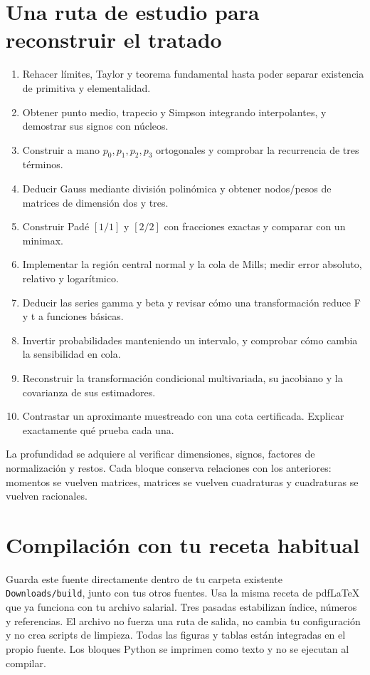 \documentclass[11pt,a4paper]{article}
\theoremstyle{definition}
\begin{document}
\section{Una ruta de estudio para reconstruir el tratado}
\begin{enumerate}
\item Rehacer límites, Taylor y teorema fundamental hasta poder separar existencia de primitiva y elementalidad.
\item Obtener punto medio, trapecio y Simpson integrando interpolantes, y demostrar sus signos con núcleos.
\item Construir a mano $p_0,p_1,p_2,p_3$ ortogonales y comprobar la recurrencia de tres términos.
\item Deducir Gauss mediante división polinómica y obtener nodos/pesos de matrices de dimensión dos y tres.
\item Construir Padé $[1/1]$ y $[2/2]$ con fracciones exactas y comparar con un minimax.
\item Implementar la región central normal y la cola de Mills; medir error absoluto, relativo y logarítmico.
\item Deducir las series gamma y beta y revisar cómo una transformación reduce F y t a funciones básicas.
\item Invertir probabilidades manteniendo un intervalo, y comprobar cómo cambia la sensibilidad en cola.
\item Reconstruir la transformación condicional multivariada, su jacobiano y la covarianza de sus estimadores.
\item Contrastar un aproximante muestreado con una cota certificada. Explicar exactamente qué prueba cada una.
\end{enumerate}
La profundidad se adquiere al verificar dimensiones, signos, factores de normalización y restos. Cada bloque conserva relaciones con los anteriores: momentos se vuelven matrices, matrices se vuelven cuadraturas y cuadraturas se vuelven racionales.

\section{Compilación con tu receta habitual}
Guarda este fuente directamente dentro de tu carpeta existente \texttt{Downloads/build}, junto con tus otros fuentes. Usa la misma receta de pdfLaTeX que ya funciona con tu archivo salarial. Tres pasadas estabilizan índice, números y referencias.
El archivo no fuerza una ruta de salida, no cambia tu configuración y no crea scripts de limpieza. Todas las figuras y tablas están integradas en el propio fuente. Los bloques Python se imprimen como texto y no se ejecutan al compilar.


\label{ultima-pagina}
\end{document}

